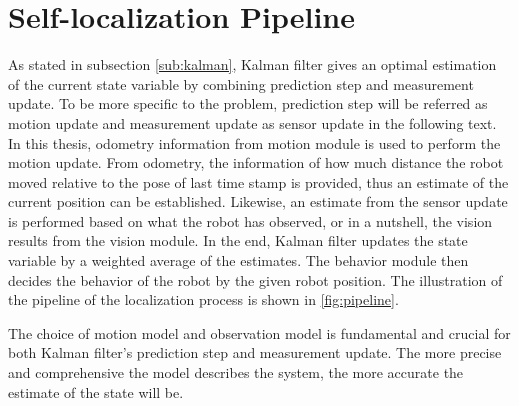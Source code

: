 \chapter{Self-localization Pipeline\label{cha:chapter4}}


As stated in subsection \ref{sub:kalman}, Kalman filter gives an optimal estimation of the current state variable by combining prediction step and measurement update. To be more specific to the problem, prediction step will be referred as motion update and measurement update as sensor update in the following text. In this thesis, odometry information from motion module is used to perform the motion update. From odometry, the information of how much distance the robot moved relative to the pose of last time stamp is provided, thus an estimate of the current position can be established. Likewise, an estimate from the sensor update is performed based on what the robot has observed, or in a nutshell, the vision results from the vision module. In the end, Kalman filter updates the state variable by a weighted average of the estimates. The behavior module then decides the behavior of the robot by the given robot position. The illustration of the pipeline of the localization process is shown in \autoref{fig:pipeline}.

The choice of motion model and observation model is fundamental and crucial for both Kalman filter's prediction step and measurement update. The more precise and comprehensive the model describes the system, the more accurate the estimate of the state will be. 


